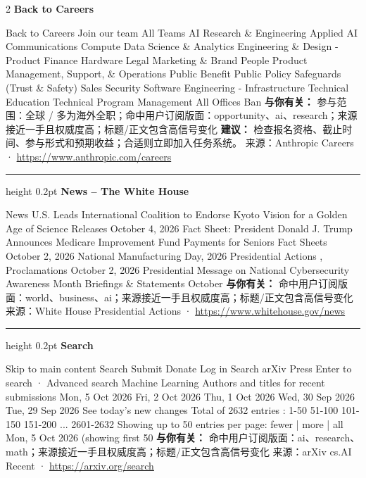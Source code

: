 \documentclass[10.5pt]{ctexart}
\begin{document}
\begin{multicols}{2}
{\large\bfseries Back to Careers}\par
Back to Careers Join our team All Teams AI Research \& Engineering Applied AI Communications Compute Data Science \& Analytics Engineering \& Design - Product Finance Hardware Legal Marketing \& Brand People Product Management, Support, \& Operations Public Benefit Public Policy Safeguards (Trust \& Safety) Sales Security Software Engineering - Infrastructure Technical Education Technical Program Management All Offices Ban
\textbf{与你有关：} 参与范围：全球 / 多为海外全职；命中用户订阅版面：opportunity、ai、research；来源接近一手且权威度高；标题/正文包含高信号变化
\textbf{建议：} 检查报名资格、截止时间、参与形式和预期收益；合适则立即加入任务系统。
{\footnotesize\color{ormuted} 来源：Anthropic Careers · \url{https://www.anthropic.com/careers}}
\vspace{2mm}
\hrule height 0.2pt
\vspace{2mm}
{\large\bfseries News – The White House}\par
News U.S. Leads International Coalition to Endorse Kyoto Vision for a Golden Age of Science Releases October 4, 2026 Fact Sheet: President Donald J. Trump Announces Medicare Improvement Fund Payments for Seniors Fact Sheets October 2, 2026 National Manufacturing Day, 2026 Presidential Actions , Proclamations October 2, 2026 Presidential Message on National Cybersecurity Awareness Month Briefings \& Statements October 
\textbf{与你有关：} 命中用户订阅版面：world、business、ai；来源接近一手且权威度高；标题/正文包含高信号变化
{\footnotesize\color{ormuted} 来源：White House Presidential Actions · \url{https://www.whitehouse.gov/news}}
\vspace{2mm}
\hrule height 0.2pt
\vspace{2mm}
{\large\bfseries Search}\par
Skip to main content Search Submit Donate Log in Search arXiv Press Enter to search · Advanced search Machine Learning Authors and titles for recent submissions Mon, 5 Oct 2026 Fri, 2 Oct 2026 Thu, 1 Oct 2026 Wed, 30 Sep 2026 Tue, 29 Sep 2026 See today's new changes Total of 2632 entries : 1-50 51-100 101-150 151-200 ... 2601-2632 Showing up to 50 entries per page: fewer | more | all Mon, 5 Oct 2026 (showing first 50
\textbf{与你有关：} 命中用户订阅版面：ai、research、math；来源接近一手且权威度高；标题/正文包含高信号变化
{\footnotesize\color{ormuted} 来源：arXiv cs.AI Recent · \url{https://arxiv.org/search}}
\vspace{2mm}

\end{multicols}
\end{document}

